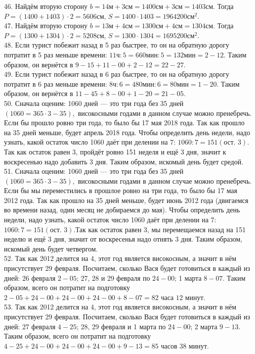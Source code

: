 \documentclass[12pt]{article}
\begin{document}
46. Найдём вторую сторону $b=14\text{м}+3\text{см}=1400\text{см}+3\text{см}=1403\text{см}.$ Тогда $P=(1400+1403)\cdot2=5606$см, $S=1400\cdot1403=1964200\text{см}^2.$\\
47. Найдём вторую сторону $b=13\text{м}+4\text{см}=1300\text{см}+4\text{см}=1304\text{см}.$ Тогда $P=(1300+1304)\cdot2=5208$см, $S=1300\cdot1304=1695200\text{см}^2.$\\
48. Если турист побежит назад в 5 раз быстрее, то он на обратную дорогу потратит в 5 раз меньше времени: $11\text{ч}:5=660\text{мин}:5=132\text{мин}=2-12.$ Таким образом, он вернётся в $9-15+11-00+2-12=22-27.$\\
49. Если турист побежит назад в 6 раз быстрее, то он на обратную дорогу потратит в 6 раз меньше времени: $8\text{ч}:6=480\text{мин}:6=80\text{мин}=1-20.$ Таким образом, он вернётся в $11-45+8-00+1-20=21-05.$\\
50. Сначала оценим: 1060 дней --- это три года без 35 дней $(1060=365\cdot3-35),$ високосными годами в данном случае можно пренебречь. Если бы прошло ровно три года, то было бы 17 мая 2018 года. Так как прошло на 35 дней меньше, будет апрель 2018 года. Чтобы определить день недели, надо узнать, какой остаток число 1060 даёт при делении на 7: $1060:7=151 (\text{ост. } 3).$Так как остаток равен 3, пройдёт ровно 151 неделя и ещё 3 дня, значит к воскресенью надо добавить 3 дня. Таким образом, искомый день будет средой.\\
51. Сначала оценим: 1060 дней --- это три года без 35 дней $(1060=365\cdot3-35),$ високосными годами в данном случае можно пренебречь. Если бы мы переместились в прошлое ровно на три года, то было бы 17 мая 2012 года. Так как прошло на 35 дней меньше, будет июнь 2012 года (двигаемся во времени назад, один месяц не добираемся до мая). Чтобы определить день недели, надо узнать, какой остаток число 1060 даёт при делении на 7: $1060:7=151 (\text{ост. } 3).$Так как остаток равен 3, мы перемещаемся назад на 151 неделю и ещё 3 дня, значит от воскресенья надо отнять 3 дня. Таким образом, искомый день будет четвергом.\\
52. Так как 2012 делится на 4, этот год является високосным, а значит в нём присутствует 29 февраля. Посчитаем, сколько Вася будет готовиться в каждый из дней: 26 февраля $2-05$; 27, 28 и 29 февраля по $24-00$; 1 марта $8-07.$ Таким образом, всего он потратит на подготовку $2-05+24-00+24-00+24-00+8-07=82\text{ часа }12\text{ минут.}$\\
53. Так как 2012 делится на 4, этот год является високосным, а значит в нём присутствует 29 февраля. Посчитаем, сколько Вася будет готовиться в каждый из дней: 27 февраля $4-25$; 28, 29 февраля и 1 марта по $24-00$; 2 марта $9-13.$ Таким образом, всего он потратит на подготовку $4-25+24-00+24-00+24-00+9-13=85\text{ часов }38\text{ минут.}$\\
\end{document}
